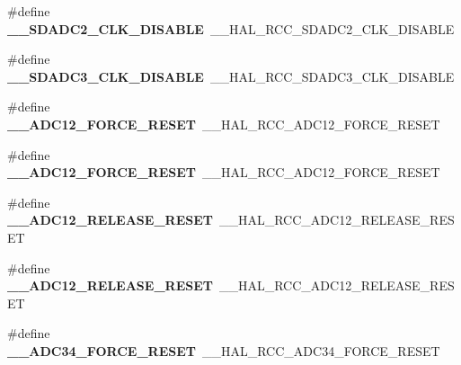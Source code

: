 \begin{DoxyCompactItemize}
\item 
\#define {\bfseries \+\_\+\+\_\+\+S\+D\+A\+D\+C2\+\_\+\+C\+L\+K\+\_\+\+D\+I\+S\+A\+B\+LE}~\+\_\+\+\_\+\+H\+A\+L\+\_\+\+R\+C\+C\+\_\+\+S\+D\+A\+D\+C2\+\_\+\+C\+L\+K\+\_\+\+D\+I\+S\+A\+B\+LE\hypertarget{group___h_a_l___r_c_c___aliased_ga99088247c1f6d91fbc4423f589139445}{}\label{group___h_a_l___r_c_c___aliased_ga99088247c1f6d91fbc4423f589139445}

\item 
\#define {\bfseries \+\_\+\+\_\+\+S\+D\+A\+D\+C3\+\_\+\+C\+L\+K\+\_\+\+D\+I\+S\+A\+B\+LE}~\+\_\+\+\_\+\+H\+A\+L\+\_\+\+R\+C\+C\+\_\+\+S\+D\+A\+D\+C3\+\_\+\+C\+L\+K\+\_\+\+D\+I\+S\+A\+B\+LE\hypertarget{group___h_a_l___r_c_c___aliased_ga42ec4cf1c87cbddc3b2298baedddba7b}{}\label{group___h_a_l___r_c_c___aliased_ga42ec4cf1c87cbddc3b2298baedddba7b}

\item 
\#define {\bfseries \+\_\+\+\_\+\+A\+D\+C12\+\_\+\+F\+O\+R\+C\+E\+\_\+\+R\+E\+S\+ET}~\+\_\+\+\_\+\+H\+A\+L\+\_\+\+R\+C\+C\+\_\+\+A\+D\+C12\+\_\+\+F\+O\+R\+C\+E\+\_\+\+R\+E\+S\+ET\hypertarget{group___h_a_l___r_c_c___aliased_gacbc2844f7655815ba4ae65f4ca715dbb}{}\label{group___h_a_l___r_c_c___aliased_gacbc2844f7655815ba4ae65f4ca715dbb}

\item 
\#define {\bfseries \+\_\+\+\_\+\+A\+D\+C12\+\_\+\+F\+O\+R\+C\+E\+\_\+\+R\+E\+S\+ET}~\+\_\+\+\_\+\+H\+A\+L\+\_\+\+R\+C\+C\+\_\+\+A\+D\+C12\+\_\+\+F\+O\+R\+C\+E\+\_\+\+R\+E\+S\+ET\hypertarget{group___h_a_l___r_c_c___aliased_gacbc2844f7655815ba4ae65f4ca715dbb}{}\label{group___h_a_l___r_c_c___aliased_gacbc2844f7655815ba4ae65f4ca715dbb}

\item 
\#define {\bfseries \+\_\+\+\_\+\+A\+D\+C12\+\_\+\+R\+E\+L\+E\+A\+S\+E\+\_\+\+R\+E\+S\+ET}~\+\_\+\+\_\+\+H\+A\+L\+\_\+\+R\+C\+C\+\_\+\+A\+D\+C12\+\_\+\+R\+E\+L\+E\+A\+S\+E\+\_\+\+R\+E\+S\+ET\hypertarget{group___h_a_l___r_c_c___aliased_gaccd3e06d5b914cebaaacbc94d05c7660}{}\label{group___h_a_l___r_c_c___aliased_gaccd3e06d5b914cebaaacbc94d05c7660}

\item 
\#define {\bfseries \+\_\+\+\_\+\+A\+D\+C12\+\_\+\+R\+E\+L\+E\+A\+S\+E\+\_\+\+R\+E\+S\+ET}~\+\_\+\+\_\+\+H\+A\+L\+\_\+\+R\+C\+C\+\_\+\+A\+D\+C12\+\_\+\+R\+E\+L\+E\+A\+S\+E\+\_\+\+R\+E\+S\+ET\hypertarget{group___h_a_l___r_c_c___aliased_gaccd3e06d5b914cebaaacbc94d05c7660}{}\label{group___h_a_l___r_c_c___aliased_gaccd3e06d5b914cebaaacbc94d05c7660}

\item 
\#define {\bfseries \+\_\+\+\_\+\+A\+D\+C34\+\_\+\+F\+O\+R\+C\+E\+\_\+\+R\+E\+S\+ET}~\+\_\+\+\_\+\+H\+A\+L\+\_\+\+R\+C\+C\+\_\+\+A\+D\+C34\+\_\+\+F\+O\+R\+C\+E\+\_\+\+R\+E\+S\+ET\hypertarget{group___h_a_l___r_c_c___aliased_ga9d32ad39aa9a52a93e5cc48977fac1a1}{}\label{group___h_a_l___r_c_c___aliased_ga9d32ad39aa9a52a93e5cc48977fac1a1}


\end{DoxyCompactItemize}
